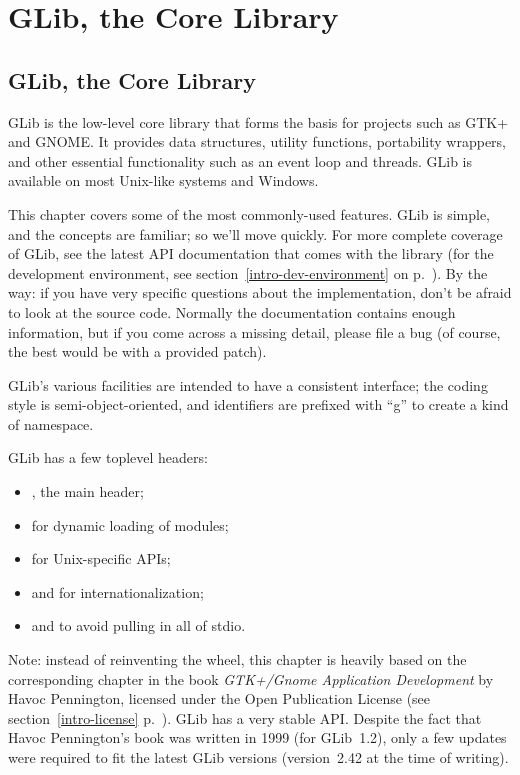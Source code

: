 \part{GLib, the Core Library}
\label{glib}

\chapter{GLib, the Core Library}

GLib is the low-level core library that forms the basis for projects such as GTK+ and GNOME. It provides data structures, utility functions, portability wrappers, and other essential functionality such as an event loop and threads. GLib is available on most Unix-like systems and Windows.

This chapter covers some of the most commonly-used features. GLib is simple, and the concepts are familiar; so we'll move quickly. For more complete coverage of GLib, see the latest API documentation that comes with the library (for the development environment, see section~\ref{intro-dev-environment} on p.~\pageref{intro-dev-environment}). By the way: if you have very specific questions about the implementation, don't be afraid to look at the source code. Normally the documentation contains enough information, but if you come across a missing detail, please file a bug (of course, the best would be with a provided patch).

GLib's various facilities are intended to have a consistent interface; the coding style is semi-object-oriented, and identifiers are prefixed with ``g'' to create a kind of namespace.

GLib has a few toplevel headers:
\begin{itemize}
  \item {}, the main header;
  \item {} for dynamic loading of modules;
  \item {} for Unix-specific APIs;
  \item {} and  for internationalization;
  \item {} and  to avoid pulling in all of stdio.
\end{itemize}

\bigskip
Note: instead of reinventing the wheel, this chapter is heavily based on the corresponding chapter in the book \emph{GTK+/Gnome Application Development} by Havoc Pennington, licensed under the Open Publication License (see section~\ref{intro-license} p.~\pageref{intro-license}). GLib has a very stable API. Despite the fact that Havoc Pennington's book was written in 1999 (for GLib~1.2), only a few updates were required to fit the latest GLib versions (version~2.42 at the time of writing).

